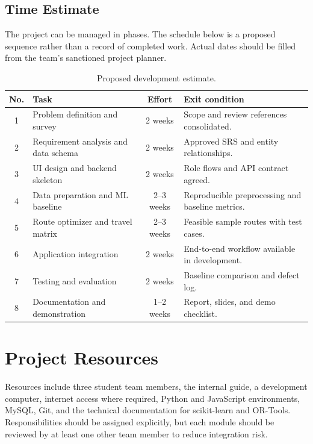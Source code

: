 \documentclass[12pt,a4paper,oneside]{report}
\begin{document}
\subsection{Time Estimate}
The project can be managed in phases. The schedule below is a proposed sequence rather than a record of completed work. Actual dates should be filled from the team's sanctioned project planner.
\begin{table}[htbp]
\centering
\begin{tabularx}{\textwidth}{c p{43mm} c X}
\toprule
\textbf{No.} & \textbf{Task} & \textbf{Effort} & \textbf{Exit condition}\\
\midrule
1 & Problem definition and survey & 2 weeks & Scope and review references consolidated.\\
2 & Requirement analysis and data schema & 2 weeks & Approved SRS and entity relationships.\\
3 & UI design and backend skeleton & 2 weeks & Role flows and API contract agreed.\\
4 & Data preparation and ML baseline & 2--3 weeks & Reproducible preprocessing and baseline metrics.\\
5 & Route optimizer and travel matrix & 2--3 weeks & Feasible sample routes with test cases.\\
6 & Application integration & 2 weeks & End-to-end workflow available in development.\\
7 & Testing and evaluation & 2 weeks & Baseline comparison and defect log.\\
8 & Documentation and demonstration & 1--2 weeks & Report, slides, and demo checklist.\\
\bottomrule
\end{tabularx}
\caption{Proposed development estimate.}
\end{table}

\section{Project Resources}
Resources include three student team members, the internal guide, a development computer, internet access where required, Python and JavaScript environments, MySQL, Git, and the technical documentation for scikit-learn and OR-Tools. Responsibilities should be assigned explicitly, but each module should be reviewed by at least one other team member to reduce integration risk.
\end{document}
